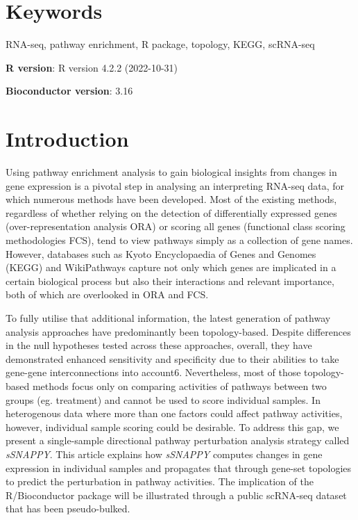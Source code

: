 \documentclass[9pt,a4paper,]{extarticle}
\begin{document}
\section*{Keywords}
RNA-seq, pathway enrichment, R package, topology, KEGG, scRNA-seq


\clearpage
\pagestyle{main}

\textbf{R version}: R version 4.2.2 (2022-10-31)

\textbf{Bioconductor version}: 3.16

\hypertarget{introduction}{%
\section{Introduction}\label{introduction}}

Using pathway enrichment analysis to gain biological insights from changes in gene expression is a pivotal step in analysing an interpreting RNA-seq data, for which numerous methods have been developed. Most of the existing methods, regardless of whether relying on the detection of differentially expressed genes (over-representation analysis ORA)\citep{Al-Shahrour2005} or scoring all genes (functional class scoring methodologies FCS)\citep{Ackermann2009}, tend to view pathways simply as a collection of gene names. However, databases such as Kyoto Encyclopaedia of Genes and Genomes (KEGG)\citep{OgataKEGGKyotoEncyclopediaa} and WikiPathways\citep{Martens2021} capture not only which genes are implicated in a certain biological process but also their interactions and relevant importance, both of which are overlooked in ORA and FCS.

To fully utilise that additional information, the latest generation of pathway analysis approaches have predominantly been topology-based\citep{Khatri2012}. Despite differences in the null hypotheses tested across these approaches, overall, they have demonstrated enhanced sensitivity and specificity due to their abilities to take gene-gene interconnections into account6. Nevertheless, most of those topology-based methods focus only on comparing activities of pathways between two groups (eg. treatment) and cannot be used to score individual samples\citep{Ma2019, Bayerlova2015}. In heterogenous data where more than one factors could affect pathway activities, however, individual sample scoring could be desirable\citep{Hanzelmann2013}. To address this gap, we present a single-sample directional pathway perturbation analysis strategy called \emph{sSNAPPY}. This article explains how \emph{sSNAPPY} computes changes in gene expression in individual samples and propagates that through gene-set topologies to predict the perturbation in pathway activities. The implication of the R/Bioconductor package will be illustrated through a public scRNA-seq dataset that has been pseudo-bulked.
\end{document}
